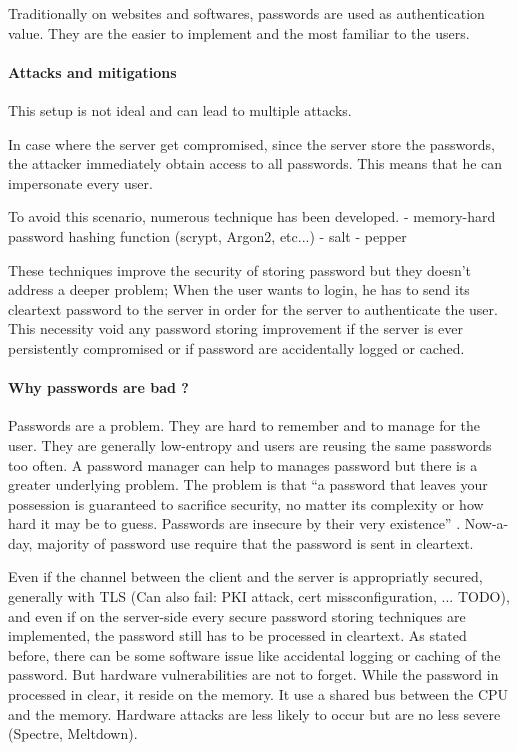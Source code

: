 \documentclass[../report.tex]{subfiles}
\begin{document}
Traditionally on websites and softwares, passwords are used as authentication value. They are the easier to implement and the most familiar to the users.



\paragraph{Attacks and mitigations}
This setup is not ideal and can lead to multiple attacks.

In case where the server get compromised, since the server store the passwords, the attacker immediately obtain access to all passwords. This means that he can impersonate every user.

To avoid this scenario, numerous technique has been developed.
- memory-hard password hashing function (scrypt, Argon2, etc...)
- salt
- pepper

These techniques improve the security of storing password but they doesn't address a deeper problem;
When the user wants to login, he has to send its cleartext password to the server in order for the server to authenticate the user. This necessity void any password storing improvement if the server is ever persistently compromised or if password are accidentally logged or cached.


\paragraph{Why passwords are bad ?}
Passwords are a problem. They are hard to remember and to manage for the user. They are generally low-entropy and users are reusing the same passwords too often. A password manager can help to manages password but there is a greater underlying problem.
The problem is that ``a password that leaves your possession is guaranteed to sacrifice security, no matter its complexity or how hard it may be to guess. Passwords are insecure by their very existence'' \cite{PAKE_Cloudflare_blog}. %
Now-a-day, majority of password use require that the password is sent in cleartext.

Even if the channel between the client and the server is appropriatly secured, generally with TLS (Can also fail: PKI attack, cert missconfiguration, ... TODO), and even if on the server-side every secure password storing techniques are implemented, the password still has to be processed in cleartext.
As stated before, there can be some software issue like accidental logging or caching of the password. But hardware vulnerabilities are not to forget. While the password in processed in clear, it reside on the memory. It use a shared bus between the CPU and the memory. Hardware attacks are less likely to occur but are no less severe (Spectre, Meltdown).
\end{document}
